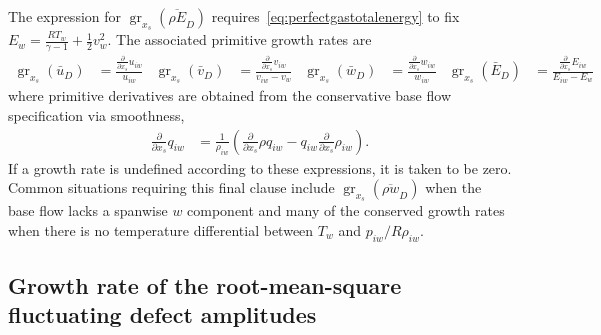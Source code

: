 \documentclass[letterpaper,11pt,nointlimits,reqno,draft]{amsbook}
\begin{document}
The expression for $\operatorname{gr}_{x_s}\!\left(\overline{\rho E}_{D}\right)$
requires~\eqref{eq:perfectgastotalenergy} to fix $E_w = \frac{R T_w}{\gamma -
1} + \frac{1}{2} v_w^2$.  The associated primitive growth rates are
\begin{align}
    \operatorname{gr}_{x_s}\!\left(\bar{u}_{D}\right)
    &=
    \frac{
        \frac{\partial}{\partial x_s}          {u}_{iw}
    }{
        {u}_{iw}
    }
    &
    \operatorname{gr}_{x_s}\!\left(\bar{v}_{D}\right)
    &=
    \frac{
        \frac{\partial}{\partial x_s}          {v}_{iw}
    }{
        {v}_{iw} - v_w
    }
    &
    \operatorname{gr}_{x_s}\!\left(\bar{w}_{D}\right)
    &=
    \frac{
        \frac{\partial}{\partial x_s}          {w}_{iw}
    }{
        {w}_{iw}
    }
    &
    \operatorname{gr}_{x_s}\!\left(\bar{E}_{D}\right)
    &=
    \frac{
        \frac{\partial}{\partial x_s}          {E}_{iw}
    }{
        {E}_{iw} - E_w
    }
\end{align}
where primitive derivatives are obtained from the conservative base flow
specification via smoothness,
\begin{align}
    \frac{\partial}{\partial x_s} q_{iw} &= \frac{1}{\rho_{iw}}\left(
          \frac{\partial}{\partial x_s} {\rho q}_{iw}
        - q_{iw} \frac{\partial}{\partial x_s} \rho_{iw}
    \right)
    .
\end{align}
If a growth rate is undefined according to these expressions, it is taken to be
zero.  Common situations requiring this final clause include
$\operatorname{gr}_{x_s}\!\left(\overline{\rho w}_D\right)$ when the base flow
lacks a spanwise $w$ component and many of the conserved growth rates when there
is no temperature differential between $T_w$ and $p_{iw} / R \rho_{iw}$.

\subsection{Growth rate of the root-mean-square fluctuating defect amplitudes}
\end{document}
